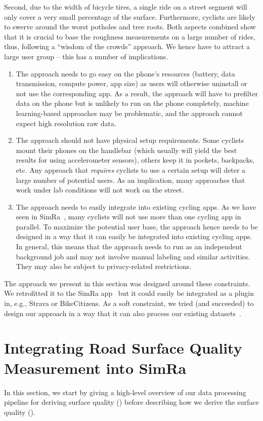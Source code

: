 Second, due to the width of bicycle tires, a single ride on a street segment will only cover a very small percentage of the surface.
Furthermore, cyclists are likely to swerve around the worst potholes and tree roots.
Both aspects combined show that it is crucial to base the roughness measurements on a large number of rides, thus, following a ``wisdom of the crowds'' approach.
We hence have to attract a large user group -- this has a number of implications.
\begin{enumerate}
	\item The approach needs to go easy on the phone's resources (battery, data transmission, compute power, app size) as users will otherwise uninstall or not use the corresponding app. As a result, the approach will have to prefilter data on the phone but is unlikely to run on the phone completely, machine learning-based approaches may be problematic, and the approach cannot expect high resolution raw data.
	\item The approach should not have physical setup requirements. Some cyclists mount their phones on the handlebar (which usually will yield the best results for using accelerometer sensors), others keep it in pockets, backpacks, etc. Any approach that \emph{requires} cyclists to use a certain setup will deter a large number of potential users. As an implication, many approaches that work under lab conditions will not work on the street.
	\item The approach needs to easily integrate into existing cycling apps. As we have seen in SimRa~\cite{karakaya2020simra}, many cyclists will not use more than one cycling app in parallel. To maximize the potential user base, the approach hence needs to be designed in a way that it can easily be integrated into existing cycling apps. In general, this means that the approach needs to run as an independent background job and may not involve manual labeling and similar activities. They may also be subject to privacy-related restrictions.
\end{enumerate}

The approach we present in this section was designed around these constraints.
We retrofitted it to the SimRa app~\cite{karakaya2020simra} but it could easily be integrated as a plugin in, e.g., Strava or BikeCitizens.
As a soft constraint, we tried (and succeeded) to design our approach in a way that it can also process our existing datasets~\cite{dataset_simra_set1,dataset_simra_set2,dataset_simra_set3}.


\section{Integrating Road Surface Quality Measurement into SimRa}
\label{sec:data_processing_pipeline}
In this section, we start by giving a high-level overview of our data processing pipeline for deriving surface quality () before describing how we derive the surface quality ().


